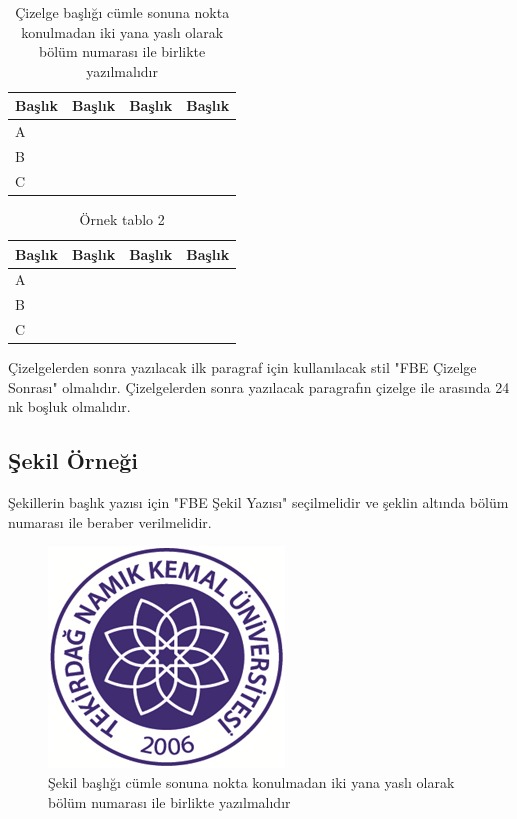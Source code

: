 \begin{table}[!t]
	\caption{Çizelge başlığı cümle sonuna nokta konulmadan iki yana yaslı olarak bölüm numarası ile birlikte yazılmalıdır}
	\begin{tabular}{L{3cm}L{3cm}L{3cm}L{3cm}}
		\hline\hline
		Başlık&Başlık&Başlık&Başlık\\\hline
	A&&&\\
	B&&&\\
	C&&&\\
	\hline\hline
	\end{tabular}
\vspace{24pt}
\end{table}


\begin{table}[!t]
	\caption{Örnek tablo 2}
	\begin{tabular}{L{3cm}L{3cm}L{3cm}L{3cm}}
	\hline
	Başlık&Başlık&Başlık&Başlık\\\hline
	A&&&\\
	B&&&\\
	C&&&\\
	\hline
\end{tabular}
\vspace{24pt}	
\end{table}

	
Çizelgelerden sonra yazılacak ilk paragraf için kullanılacak stil "FBE Çizelge Sonrası" olmalıdır. Çizelgelerden sonra yazılacak paragrafın çizelge ile arasında 24 nk boşluk olmalıdır. 

\subsection{Şekil Örneği}
\noindent Şekillerin başlık yazısı için "FBE Şekil Yazısı" seçilmelidir ve şeklin altında bölüm numarası ile beraber verilmelidir.

\begin{figure}[!h]
	\includegraphics[width=0.2\linewidth]{sekiller/nku_logo}
	\caption{Şekil başlığı cümle sonuna nokta konulmadan iki yana yaslı olarak bölüm numarası ile birlikte yazılmalıdır}
	\label{fig:nkulogo}
	\vspace{24pt}
\end{figure}

